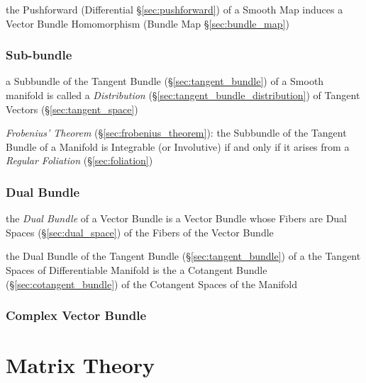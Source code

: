 the Pushforward (Differential \S\ref{sec:pushforward}) of a Smooth Map induces a
Vector Bundle Homomorphism (Bundle Map \S\ref{sec:bundle_map})



\subsubsection{Sub-bundle}\label{sec:subbundle}

\fist a Subbundle of the Tangent Bundle (\S\ref{sec:tangent_bundle}) of a
Smooth manifold is called a \emph{Distribution}
(\S\ref{sec:tangent_bundle_distribution}) of Tangent Vectors
(\S\ref{sec:tangent_space})


\emph{Frobenius' Theorem} (\S\ref{sec:frobenius_theorem}): the Subbundle of the
Tangent Bundle of a Manifold is Integrable (or Involutive) if and only if it
arises from a \emph{Regular Foliation} (\S\ref{sec:foliation})



\subsubsection{Dual Bundle}\label{sec:dual_vectorbundle}

the \emph{Dual Bundle} of a Vector Bundle is a Vector Bundle whose Fibers are
Dual Spaces (\S\ref{sec:dual_space}) of the Fibers of the Vector Bundle

the Dual Bundle of the Tangent Bundle (\S\ref{sec:tangent_bundle}) of a the
Tangent Spaces of Differentiable Manifold is the a Cotangent Bundle
(\S\ref{sec:cotangent_bundle}) of the Cotangent Spaces of the Manifold



\subsubsection{Complex Vector Bundle}\label{sec:complex_vector_bundle}



\section{Matrix Theory}\label{sec:matrix_theory}


